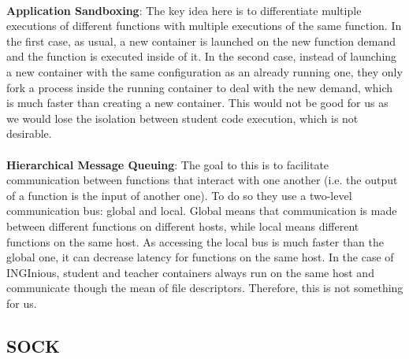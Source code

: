 \paragraph{}\textbf{Application Sandboxing}: The key idea here is to differentiate multiple executions of different functions with multiple executions of the same function.  In the first case, as usual, a new container is launched on the new function demand and the function is executed inside of it.  In the second case, instead of launching a new container with the same configuration as an already running one, they only fork a process inside the running container to deal with the new demand, which is much faster than creating a new container.  This would not be good for us as we would lose the isolation between student code execution, which is not desirable.
\paragraph{}\textbf{Hierarchical Message Queuing}: The goal to this is to facilitate communication between functions that interact with one another (i.e. the output of a function is the input of another one).  To do so they use a two-level communication bus: global and local.  Global means that communication is made between different functions on different hosts, while local means different functions on the same host.  As accessing the local bus is much faster than the global one, it can decrease latency for functions on the same host.  In the case of INGInious, student and teacher containers always run on the same host and communicate though the mean of file descriptors.  Therefore, this is not something for us.


\subsection{SOCK} \label{subsec-sock}
